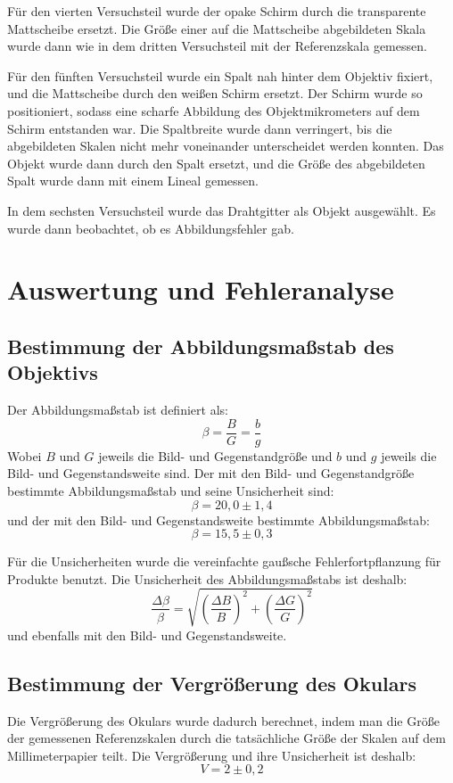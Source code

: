 \documentclass[11pt,a4paper]{article}
\begin{document}
Für den vierten Versuchsteil wurde der opake Schirm durch die transparente Mattscheibe ersetzt. Die Größe einer auf die Mattscheibe abgebildeten Skala wurde dann wie in dem dritten Versuchsteil mit der Referenzskala gemessen. 

Für den fünften Versuchsteil wurde ein Spalt nah hinter dem Objektiv fixiert, und die Mattscheibe durch den weißen Schirm ersetzt. Der Schirm wurde so positioniert, sodass eine scharfe Abbildung des Objektmikrometers auf dem Schirm entstanden war. Die Spaltbreite wurde dann verringert, bis die abgebildeten Skalen nicht mehr voneinander unterscheidet werden konnten. Das Objekt wurde dann durch den Spalt ersetzt, und die Größe des abgebildeten Spalt wurde dann mit einem Lineal gemessen. 

In dem sechsten Versuchsteil wurde das Drahtgitter als Objekt ausgewählt. Es wurde dann beobachtet, ob es Abbildungsfehler gab. 


\section{Auswertung und Fehleranalyse}
\subsection{Bestimmung der Abbildungsmaßstab des Objektivs}
Der Abbildungsmaßstab ist definiert als:
$$ \beta = \frac{B}{G} = \frac{b}{g} $$
Wobei $B$ und $G$ jeweils die Bild- und Gegenstandgröße und $b$ und $g$ jeweils die Bild- und Gegenstandsweite sind. Der mit den Bild- und Gegenstandgröße bestimmte Abbildungsmaßstab und seine Unsicherheit sind:
$$ \beta = 20,0 \pm 1,4 $$
und der mit den Bild- und Gegenstandsweite bestimmte Abbildungsmaßstab:
$$ \beta = 15,5 \pm 0,3 $$

Für die Unsicherheiten wurde die vereinfachte gaußsche Fehlerfortpflanzung für Produkte benutzt. Die Unsicherheit des Abbildungsmaßstabs ist deshalb:
$$ \frac{\Delta \beta}{\beta} = \sqrt{\left(\frac{\Delta B}{B}\right)^2+\left(\frac{\Delta G}{G}\right)^2}$$
und ebenfalls mit den Bild- und Gegenstandsweite. 

\subsection{Bestimmung der Vergrößerung des Okulars}
Die Vergrößerung des Okulars wurde dadurch berechnet, indem man die Größe der gemessenen Referenzskalen durch die tatsächliche Größe der Skalen auf dem Millimeterpapier teilt. Die Vergrößerung und ihre Unsicherheit ist deshalb:
$$ V = 2 \pm 0,2 $$ 
\end{document}
